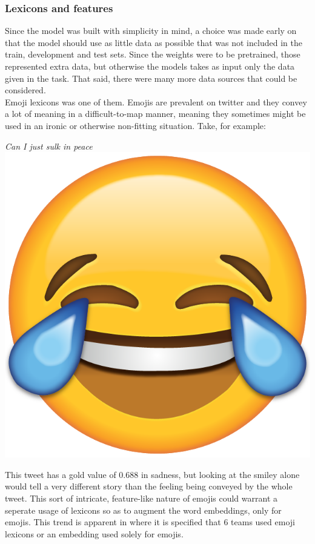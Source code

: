 \subsubsection{Lexicons and features}
Since the model was built with simplicity in mind, a choice was made early on that the model should use as little data as possible that was not included in the train, development and test sets. Since the weights were to be pretrained, those represented extra data, but otherwise the models takes as input only the data given in the task. That said, there were many more data sources that could be considered.\\
Emoji lexicons was one of them. Emojis are prevalent on twitter and they convey a lot of meaning in a difficult-to-map manner, meaning they sometimes might be used in an ironic or otherwise non-fitting situation. Take, for example:\\
\begin{center}
\textit{Can I just sulk in peace} \includegraphics[scale=0.015]{pictures/tears_of_joy_emoji.png}
\end{center}
This tweet has a gold value of 0.688 in sadness, but looking at the smiley alone would tell a very different story than the feeling being conveyed by the whole tweet. This sort of intricate, feature-like nature of emojis could warrant a seperate usage of lexicons so as to augment the word embeddings, only for emojis. This trend is apparent in \cite{wassa2017} where it is specified that 6 teams used emoji lexicons or an embedding used solely for emojis.\\
